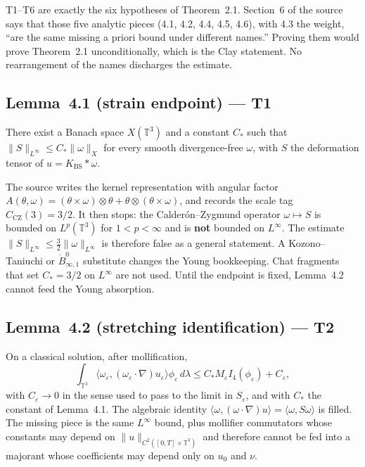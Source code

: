 \documentclass[11pt]{article}
\theoremstyle{plain}
\theoremstyle{definition}
\theoremstyle{remark}
\newcommand{\Tthree}{\mathbb{T}^{3}}
\begin{document}
T1--T6 are exactly the six hypotheses of Theorem~2.1. Section~6 of the source says that those five analytic pieces (4.1, 4.2, 4.4, 4.5, 4.6), with 4.3 the weight, ``are the same missing a priori bound under different names.'' Proving them would prove Theorem~2.1 unconditionally, which is the Clay statement. No rearrangement of the names discharges the estimate.

\subsection{Lemma~4.1 (strain endpoint) --- T1}

There exist a Banach space \(X(\Tthree)\) and a constant \(C_{\ast}\) such that \(\|S\|_{L^{\infty}}\le C_{\ast}\|\omega\|_{X}\) for every smooth divergence-free \(\omega\), with \(S\) the deformation tensor of \(u=K_{\mathrm{BS}}\ast\omega\).

The source writes the kernel representation with angular factor \(A(\theta,\omega)=(\theta\times\omega)\otimes\theta+\theta\otimes(\theta\times\omega)\), and records the scale tag \(C_{\mathrm{CZ}}(3)=3/2\). It then stops: the Calder\'on--Zygmund operator \(\omega\mapsto S\) is bounded on \(L^{p}(\Tthree)\) for \(1<p<\infty\) and is \textbf{not} bounded on \(L^{\infty}\). The estimate \(\|S\|_{L^{\infty}}\le\tfrac{3}{2}\|\omega\|_{L^{\infty}}\) is therefore false as a general statement. A Kozono--Taniuchi or \(\dot B^{0}_{\infty,1}\) substitute changes the Young bookkeeping. Chat fragments that set \(C_{\ast}=3/2\) on \(L^{\infty}\) are not used. Until the endpoint is fixed, Lemma~4.2 cannot feed the Young absorption.

\subsection{Lemma~4.2 (stretching identification) --- T2}

On a classical solution, after mollification,
\[
\int_{\Tthree}\langle\omega_{\varepsilon},(\omega_{\varepsilon}\cdot\nabla)u_{\varepsilon}\rangle\phi_{\varepsilon}\,d\lambda
\le C_{\ast} M_{\varepsilon} I_{4}(\phi_{\varepsilon})+C_{\varepsilon},
\]
with \(C_{\varepsilon}\to 0\) in the sense used to pass to the limit in \(S_{\varepsilon}\), and with \(C_{\ast}\) the constant of Lemma~4.1. The algebraic identity \(\langle\omega,(\omega\cdot\nabla)u\rangle=\langle\omega,S\omega\rangle\) is filled. The missing piece is the same \(L^{\infty}\) bound, plus mollifier commutators whose constants may depend on \(\|u\|_{C^{2}([0,T]\times\Tthree)}\) and therefore cannot be fed into a majorant whose coefficients may depend only on \(u_{0}\) and \(\nu\).
\end{document}
